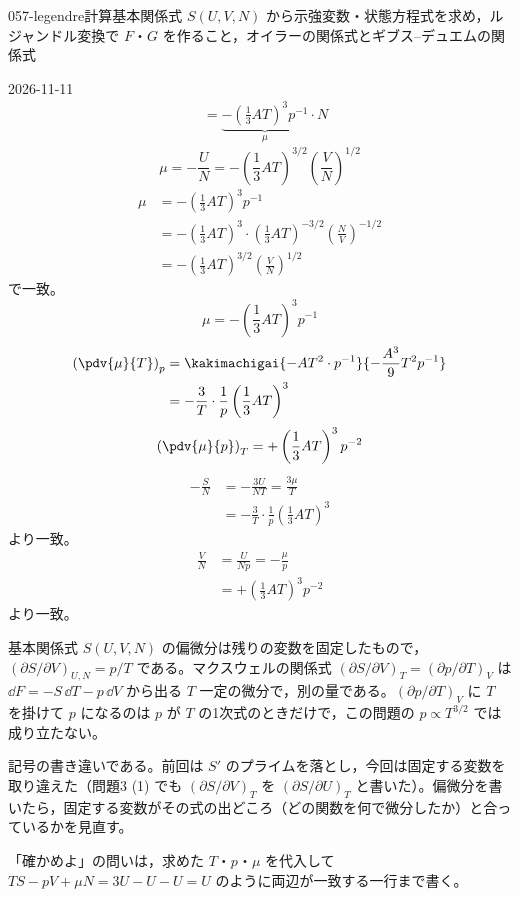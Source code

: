 \documentclass[uplatex,dvipdfmx,a4paper,11pt]{jsarticle}
\begin{document}
\begin{mondai}{057-legendre}{計算}{基本関係式 $S(U,V,N)$ から示強変数・状態方程式を求め，ルジャンドル変換で $F$・$G$ を作ること，オイラーの関係式とギブス--デュエムの関係式}
\begin{kotaeutsushi}{2026-11-11}
\begin{align*}
&=\underbrace{-\left(\frac{1}{3}AT\right)^{3}p^{-1}}_{\mu}\cdot N
\end{align*}
\[ \mu=-\frac{U}{N}=-\left(\frac{1}{3}AT\right)^{3/2}\left(\frac{V}{N}\right)^{1/2} \]
\begin{align*}
\mu&=-\left(\frac{1}{3}AT\right)^{3}p^{-1}\\
&=-\left(\frac{1}{3}AT\right)^{3}\cdot\left(\frac{1}{3}AT\right)^{-3/2}\left(\frac{N}{V}\right)^{-1/2}\\
&=-\left(\frac{1}{3}AT\right)^{3/2}\left(\frac{V}{N}\right)^{1/2}
\end{align*}
で一致。
\[ \mu=-\left(\frac{1}{3}AT\right)^{3}p^{-1} \]
\begin{align*}
\left(\pdv{\mu}{T}\right)_{p}&=\kakimachigai{-AT^{2}\cdot p^{-1}}{-\frac{A^{3}}{9}T^{2}p^{-1}}\\
&=-\frac{3}{T}\cdot\frac{1}{p}\left(\frac{1}{3}AT\right)^{3}
\end{align*}
\[ \left(\pdv{\mu}{p}\right)_{T}=+\left(\frac{1}{3}AT\right)^{3}p^{-2} \]
\begin{align*}
-\frac{S}{N}&=-\frac{3U}{NT}=\frac{3\mu}{T}\\
&=-\frac{3}{T}\cdot\frac{1}{p}\left(\frac{1}{3}AT\right)^{3}
\end{align*}
より一致。
\begin{align*}
\frac{V}{N}&=\frac{U}{Np}=-\frac{\mu}{p}\\
&=+\left(\frac{1}{3}AT\right)^{3}p^{-2}
\end{align*}
より一致。
\end{kotaeutsushi}
\begin{kizuki}
\item 基本関係式 $S(U,V,N)$ の偏微分は残りの変数を固定したもので，$(\partial S/\partial V)_{U,N}=p/T$ である。マクスウェルの関係式 $(\partial S/\partial V)_{T}=(\partial p/\partial T)_{V}$ は $\dd F=-S\,\dd T-p\,\dd V$ から出る $T$ 一定の微分で，別の量である。$(\partial p/\partial T)_{V}$ に $T$ を掛けて $p$ になるのは $p$ が $T$ の1次式のときだけで，この問題の $p\propto T^{3/2}$ では成り立たない。
\item {} 記号の書き違いである。前回は $S'$ のプライムを落とし，今回は固定する変数を取り違えた（問題3 (1) でも $(\partial S/\partial V)_{T}$ を $(\partial S/\partial U)_{T}$ と書いた）。偏微分を書いたら，固定する変数がその式の出どころ（どの関数を何で微分したか）と合っているかを見直す。
\item 「確かめよ」の問いは，求めた $T$・$p$・$\mu$ を代入して $TS-pV+\mu N=3U-U-U=U$ のように両辺が一致する一行まで書く。

\end{kizuki}
\end{mondai}
\end{document}
